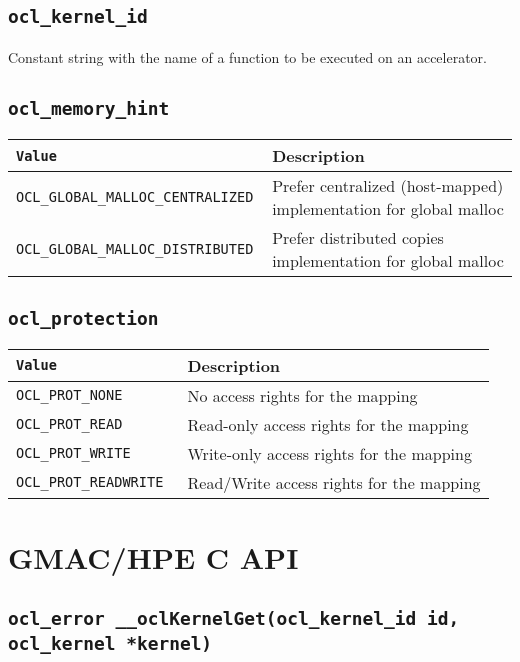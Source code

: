 \subsection{\texttt{ocl\_kernel\_id}}

Constant string with the name of a function to be executed on an accelerator.

\subsection{\texttt{ocl\_memory\_hint}}
\begin{tabularx}{\linewidth}{|>{\texttt\bgroup}l<{\egroup}|X|}
  \hline
  \textnormal{Value} & Description \\
  \hline
  \hline
  OCL\_GLOBAL\_MALLOC\_CENTRALIZED & Prefer centralized (host\hyp{}mapped) implementation for global 
  malloc \\
  OCL\_GLOBAL\_MALLOC\_DISTRIBUTED & Prefer distributed copies implementation for global malloc \\
  \hline
\end{tabularx}


\subsection{\texttt{ocl\_protection}}
\begin{tabularx}{\linewidth}{|>{\texttt\bgroup}l<{\egroup}|X|}
  \hline
  \textnormal{Value} & Description \\
  \hline
  \hline
  OCL\_PROT\_NONE  & No access rights for the mapping \\
  OCL\_PROT\_READ  & Read\hyp{}only access rights for the mapping \\
  OCL\_PROT\_WRITE & Write\hyp{}only access rights for the mapping \\
  OCL\_PROT\_READWRITE & Read\slash{}Write access rights for the mapping \\
  \hline
\end{tabularx}

\section{GMAC\slash HPE C API}

\subsection{\texttt{ocl\_error \_\_oclKernelGet(ocl\_kernel\_id id, ocl\_kernel *kernel)}}

